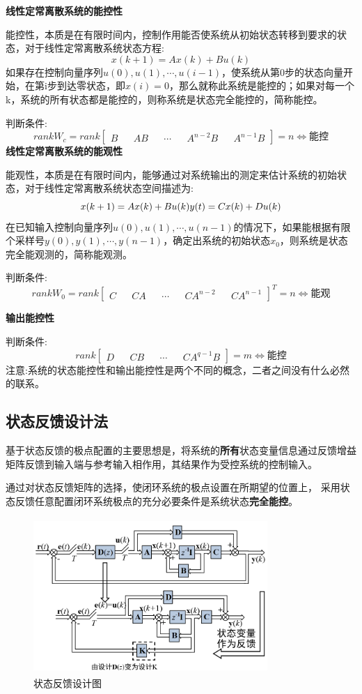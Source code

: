 \documentclass[12pt, a4paper, oneside]{ctexbook}
\begin{document}
\noindent \textbf{线性定常离散系统的能控性}

能控性，本质是在有限时间内，控制作用能否使系统从初始状态转移到要求的状态，对于线性定常离散系统状态方程:
$$
x(k+1) = Ax(k)+Bu(k)
$$
如果存在控制向量序列$u(0),u(1),\cdots,u(i-1)$，使系统从第0步的状态向量开始，在第i步到达零状态，即$x(i)=0$，那么就称此系统是能控的；如果对每一个k，系统的所有状态都是能控的，则称系统是状态完全能控的，简称能控。

判断条件:
$$
rankW_c=rank
\left[
\begin{matrix}
	B&&AB&&\cdots&&A^{n-2}B&&A^{n-1}B
\end{matrix}
\right]=n\Leftrightarrow \mbox{能控}
$$
\textbf{线性定常离散系统的能观性}

能观性，本质是在有限时间内，能够通过对系统输出的测定来估计系统的初始状态，对于线性定常离散系统状态空间描述为:
$$
x(k+1)=Ax(k)+Bu(k)\\
y(t)=Cx(k)+Du(k)\\
$$
在已知输入控制向量序列$u(0),u(1),\cdots,u(n-1)$的情况下，如果能根据有限个采样号$y(0),y(1),\cdots,y(n-1)$，确定出系统的初始状态$x_0$，则系统是状态完全能观测的，简称能观测。

判断条件:
$$
rankW_0=rank
\left[
\begin{matrix}
	C&&CA&&\cdots&&CA^{n-2}&&CA^{n-1}
\end{matrix}
\right]^T=n\Leftrightarrow \mbox{能观}
$$

\noindent \textbf{输出能控性}

判断条件:
$$rank
\left[
\begin{matrix}
	D&&CB&&\cdots&&CA^{q-1}B
\end{matrix}
\right]=m\Leftrightarrow \mbox{能控}
$$
注意:系统的状态能控性和输出能控性是两个不同的概念，二者之间没有什么必然的联系。

\subsection{状态反馈设计法}
基于状态反馈的极点配置的主要思想是，将系统的\textbf{所有}状态变量信息通过反馈增益矩阵反馈到输入端与参考输入相作用，其结果作为受控系统的控制输入。

通过对状态反馈矩阵的选择，使闭环系统的极点设置在所期望的位置上， 
采用状态反馈任意配置闭环系统极点的充分必要条件是系统状态\textbf{完全能控}。

\begin{figure}[htbp]
	\centering
	\includegraphics[width=8.9cm,height=5.9cm]{img/8_1.png}
	\caption{状态反馈设计图}
\end{figure}
\newpage
\end{document}
